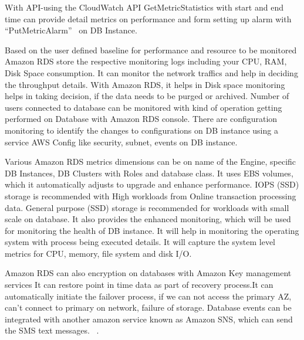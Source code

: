 With API-using the CloudWatch API GetMetricStatistics with start and end time 
can provide detail metrics on performance and form setting up alarm 
with ``PutMetricAlarm''~\cite{hid-sp18-520-amardsmon} on DB Instance.

Based on the user defined baseline for performance and resource to be monitored
Amazon RDS store the respective monitoring logs including your CPU, RAM, Disk 
Space consumption. It can monitor the network traffics and help in deciding 
the throughput details. With Amazon RDS, it helps in Disk space monitoring 
helps in taking decision, if the data needs to be purged or archived.
Number of users connected to database can be monitored with kind of operation 
getting performed on Database with Amazon RDS console. There are configuration
monitoring to identify the changes to configurations on DB instance using a 
service AWS Config like security, subnet, events on DB instance.

Various Amazon RDS metrics dimensions can be on name of the Engine, specific 
DB Instances, DB Clusters with Roles and database class. 
It uses EBS volumes, which it automatically adjusts to upgrade and 
enhance performance.
IOPS (SSD) storage is recommended with High workloads from Online 
transaction processing data.
General purpose (SSD) storage is recommended for workloads with small
scale on database.
It also provides the enhanced monitoring, which will be used for monitoring 
the health of DB instance. It will help in monitoring the operating system 
with process being executed details. It will capture the system level metrics 
for CPU, memory, file system and disk I/O.


Amazon RDS can also encryption on databases with Amazon Key management services
It can restore point in time data as part of recovery process.It can 
automatically initiate the failover process, if we can not access the 
primary AZ, can't connect to primary on network, failure of storage.
Database events can be integrated with another amazon service known as
Amazon SNS, which can send the SMS text messages.
~\cite{hid-sp18-520-amardsmon}.

